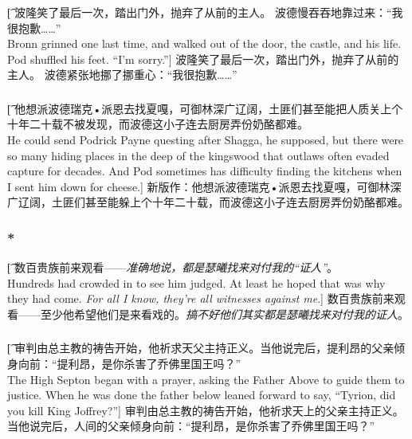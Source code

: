 \documentclass[12pt,a4paper]{article}
\begin{document}
\subsubsection{}\t[
	波隆笑了最后一次，踏出门外，抛弃了从前的主人。
	波德慢吞吞地靠过来：“我很抱歉……”\\
	Bronn grinned one last time, and walked out of the door, the castle, and his life.
	Pod shuffled his feet. “I'm sorry.”]
	波隆笑了最后一次，踏出门外，抛弃了从前的主人。
	波德紧张地挪了挪重心：“我很抱歉……”	
	
\subsubsection{}\t[
	他想派波德瑞克•派恩去找夏嘎，可御林深广辽阔，土匪们甚至能把人质关上个十年二十载不被发现，而波德这小子连去厨房弄份奶酪都难。\\
	He could send Podrick Payne questing after Shagga, he supposed, but there were so many hiding places in the deep of the kingswood that outlaws often evaded capture for decades. And Pod sometimes has difficulty finding the kitchens when I sent him down for cheese.]
	新版作：他想派波德瑞克•派恩去找夏嘎，可御林深广辽阔，土匪们甚至能躲上个十年二十载，而波德这小子连去厨房弄份奶酪都难。
	
\subsubsection{\color{red}*}\t[
	数百贵族前来观看——\emph{准确地说，都是瑟曦找来对付我的“证人”}。\\
	Hundreds had crowded in to see him judged. At least he hoped that was why they had come. \emph{For all I know, they're all witnesses against me}.]
	数百贵族前来观看——至少他希望他们是来看戏的。\emph{搞不好他们其实都是瑟曦找来对付我的证人}。
	
\subsubsection{}\t[
	审判由总主教的祷告开始，他祈求天父主持正义。当他说完后，提利昂的父亲倾身向前：“提利昂，是你杀害了乔佛里国王吗？”\\
	The High Septon began with a prayer, asking the Father Above to guide them to justice. When he was done the father below leaned forward to say, “Tyrion, did you kill King Joffrey?”]
	审判由总主教的祷告开始，他祈求天上的父亲主持正义。当他说完后，人间的父亲倾身向前：“提利昂，是你杀害了乔佛里国王吗？”
	
\end{document}
